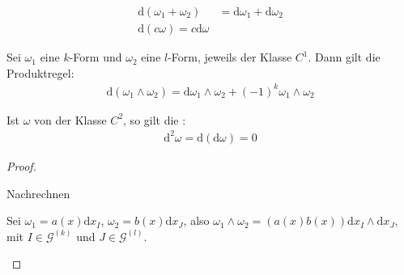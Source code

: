 \begin{theorem}[Satz] \label{8.5}
  \begin{enum-arab}
    \item
      \begin{align*}
        \mathrm d(\omega_1 + \omega_2) &= \mathrm d \omega_1 + \mathrm d \omega_2 \\
        \mathrm d(c \omega) = c \mathrm d \omega
      \end{align*}
    \item
      Sei $\omega_1$ eine $k$-Form und $\omega_2$ eine $l$-Form, jeweils der Klasse $C^1$.
      Dann gilt die Produktregel:
      \begin{align*}
        \mathrm d (\omega_1 \wedge \omega_2) = \mathrm d \omega_1 \wedge \omega_2 + (-1)^k \omega_1 \wedge \omega_2
      \end{align*}
    \item
      Ist $\omega$ von der Klasse $C^2$, so gilt die :
      \begin{align*}
        \mathrm d^2 \omega = \mathrm d(\mathrm d \omega) = 0
      \end{align*}
  \end{enum-arab}
  \begin{proof}
    \begin{enum-arab}
      \item
        Nachrechnen
      \item
        Sei $\omega_1 = a(x) \mathrm d x_I$, $\omega_2 = b(x) \mathrm d x_J$, also $\omega_1 \wedge \omega_2 = (a(x)b(x)) \mathrm d x_I \wedge \mathrm d x_J$, mit $I \in \mathcal G^{(k)}$ und $J \in \mathcal G^{(l)}$.



\end{enum-arab}
\end{proof}
\end{theorem}

